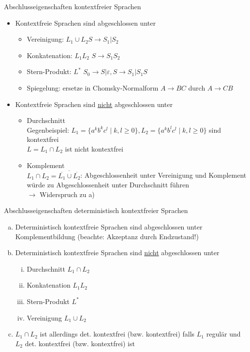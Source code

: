 \begin{frame}{Abschlusseigenschaften kontextfreier Sprachen}
	\begin{itemize}
		\item Kontextfreie Sprachen sind abgeschlossen unter
		\begin{itemize}
			\item Vereinigung: $L_1\cup L_2$\qquad $S \rightarrow S_1|S_2$
			\item Konkatenation: $L_1L_2$ \qquad $S\rightarrow S_1S_2$
			\item Stern-Produkt: $L^*$ \qquad $S_0\rightarrow S|\varepsilon, S\rightarrow S_1|S_1S$
			\item Spiegelung: ersetze in Chomsky-Normalform $A\rightarrow BC$ durch $A \rightarrow CB$
		\end{itemize}
		\item Kontextfreie Sprachen sind \underline{nicht} abgeschlossen unter
		\begin{itemize}
			\item [a)] Durchschnitt\\
			Gegenbeispiel: $L_1=\{a^kb^kc^l\mid k,l\geq 0\}, L_2=\{a^kb^lc^l\mid k,l\geq 0\}$ sind kontextfrei\\
			$L=L_1\cap L_2$ ist nicht kontextfrei
			\item [b)] Komplement\\
			$L_1 \cap L_2 = \overline{\overline{L_1} \cup \overline{L_2}}$: Abgeschlossenheit unter Vereinigung und Komplement würde zu Abgeschlossenheit unter Durchschnitt führen\\
			$\rightarrow$ Widerspruch zu a) \Lightning
			
		\end{itemize}
	\end{itemize}
\end{frame}

\begin{frame}{Abschlusseigenschaften deterministisch kontextfreier Sprachen}
	\begin{enumerate}[a)]
		\item Deterministisch kontextfreie Sprachen sind abgeschlossen unter Komplementbildung (beachte: Akzeptanz durch Endzustand!)
		\item Deterministisch kontextfreie Sprachen sind \underline{nicht} abgeschlossen unter
		\begin{enumerate}[i.]
			\item Durchschnitt $L_1 \cap L_2$
			\item Konkatenation $L_1L_2$
			\item Stern-Produkt $L^*$
			\item Vereinigung $L_1 \cup L_2$
		\end{enumerate}
		\item $L_1 \cap L_2$ ist allerdings det. kontextfrei (bzw. kontextfrei) falls $L_1$ regulär und $L_2$ det. kontextfrei (bzw. kontextfrei) ist
	\end{enumerate}
\end{frame}
